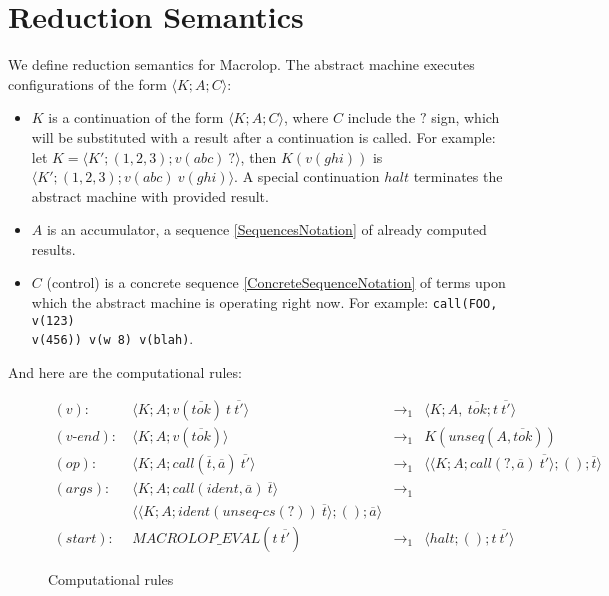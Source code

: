 \documentclass[12pt]{article}
\theoremstyle{break}
\begin{document}
\section{Reduction Semantics}

We define reduction semantics for Macrolop. The abstract machine executes configurations
of the form $\langle K; A; C \rangle$:

\begin{itemize}
    \item $K$ is a continuation of the form $\langle K; A; C \rangle$, where
    $C$ include the $?$ sign, which will be substituted with a result after a
    continuation is called. For example: let $K = \langle K'; (1, 2, 3); v(abc) \ ? \rangle$,
    then $K(v(ghi))$ is $\langle K'; (1, 2, 3); v(abc) \ v(ghi) \rangle$. A special
    continuation $halt$ terminates the abstract machine with provided result.

    \item $A$ is an accumulator, a sequence \ref{SequencesNotation} of already computed
    results.

    \item $C$ (control) is a concrete sequence \ref{ConcreteSequenceNotation} of terms
    upon which the abstract machine is operating right now. For example:
    \texttt{call(FOO, v(123) \\ v(456)) v(w 8) v(blah)}.
\end{itemize}

And here are the computational rules:

\begin{figure}[H]
    \caption{Computational rules}

    \begin{align*}
        (v): \ & \langle K; A; v(\overline{tok}) \ t \ \overline{t'} \rangle & \to_1 &
            \langle K; A, \ \overline{tok}; t \ \overline{t'} \rangle \\
        (v\mbox{-}end): \ & \langle K; A; v(\overline{tok}) \rangle & \to_1 &
            K(unseq(A, \overline{tok})) \\
        (op): \ & \langle K; A; call(\overline{t}, \overline{a}) \ \overline{t'} \rangle & \to_1 &
            \langle \langle K; A; call(?, \overline{a}) \ \overline{t'} \rangle; (); \overline{t} \rangle \\
        (args): \ & \langle K; A; call(ident, \overline{a}) \ \overline{t} \rangle & \to_1 \\
            & \langle \langle K; A; ident(unseq\mbox{-}cs(?)) \ \overline{t} \rangle; (); \overline{a} \rangle \\
        (start): \ & MACROLOP\_EVAL(t \ \overline{t'}) & \to_1 &
            \langle halt; (); t \ \overline{t'} \rangle
    \end{align*}
\end{figure}
\end{document}
